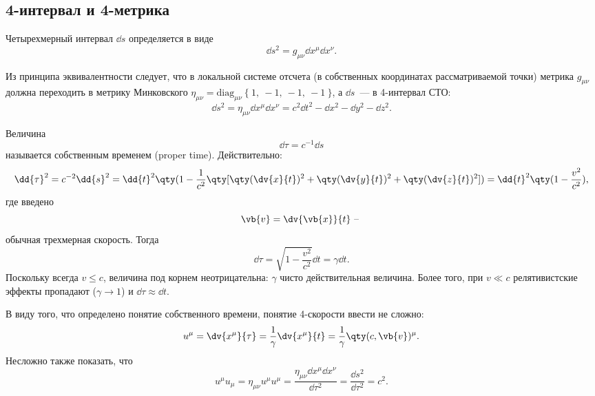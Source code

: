 \documentclass[\docroot/reports/draft/report.tex]{subfiles}
\begin{document}
\onlyinsubfile{\tableofcontents}

\subsection{4-интервал и 4-метрика}

    Четырехмерный интервал $\dd{s}$ определяется в виде
    \begin{equation*}
        \dd{s}^2 = g_{\mu\nu} \dd{x^\mu} \dd{x^\nu} .
    \end{equation*}

    Из принципа эквивалентности следует, что в локальной системе отсчета (в собственных координатах рассматриваемой точки) метрика $g_{\mu\nu}$ должна переходить в метрику Минковского $\eta_{\mu\nu} = \text{diag}_{\mu\nu}\ \{\ 1,\ -1,\ -1,\ -1\ \}$, а $\dd{s}$~--- в 4-интервал СТО:
    \begin{equation*}
        \dd{s}^2 = \eta_{\mu\nu} \dd{x^\mu} \dd{x^\nu} = c^2 \dd{t}^2 - \dd{x}^2 - \dd{y}^2 - \dd{z}^2 .
    \end{equation*}

    Величина
    \begin{equation*}
        \dd{\tau} = c^{-1} \dd{s}
    \end{equation*}
    называется собственным временем (proper time). Действительно:
    \begin{equation*}
        \dd{\tau}^2 = c^{-2} \dd{s}^2 = \dd{t}^2 \qty(
            1 - \frac{1}{c^2} \qty[\qty(\dv{x}{t})^2 + \qty(\dv{y}{t})^2 + \qty(\dv{z}{t})^2]
        ) = \dd{t}^2 \qty(1 - \frac{v^2}{c^2}) ,
    \end{equation*}
    где введено
    \begin{equation*}
        \vb{v} = \dv{\vb{x}}{t} \text{ -- }
    \end{equation*}
    обычная трехмерная скорость. Тогда
    \begin{equation*}
        \dd{\tau} = \sqrt{1 - \frac{v^2}{c^2}} \dd{t} = \gamma \dd{t}.
    \end{equation*}
    Поскольку всегда $v \leq c$, величина под корнем неотрицательна: $\gamma$ чисто действительная величина. Более того, при $v \ll c$ релятивистские эффекты пропадают ($\gamma \to 1$) и $\dd{\tau} \approx \dd{t}$.

    В виду того, что определено понятие собственного времени, понятие 4-скорости ввести не сложно:
    \begin{equation*}
        u^\mu = \dv{x^\mu}{\tau} = \frac{1}{\gamma} \dv{x^\mu}{t}
              = \frac{1}{\gamma} \qty(c, \vb{v})^\mu .
    \end{equation*}
    Несложно также показать, что
    \begin{equation*}
        u^\mu u_\mu = \eta_{\mu\nu} u^\mu u^\mu
                    = \frac{\eta_{\mu\nu} \dd{x^\mu}\dd{x^\nu}}{\dd{\tau}^2}
                    = \frac{\dd{s}^2}{\dd{\tau}^2}
                    = c^2 .
    \end{equation*}
\end{document}
